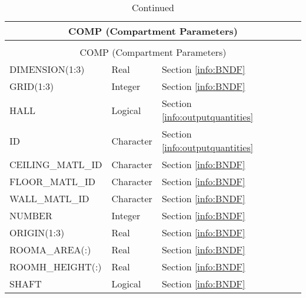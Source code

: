 \begin{longtable}{@{\extracolsep{\fill}}|l|l|l|l|l|}
\caption[Boundary file parameters ({\ct COMP} namelist group)]{For more information see Section~\ref{info:BNDF}.}
\label{tbl:COMP} \\
\hline
\multicolumn{5}{|c|}{{\ct COMP} (Compartment Parameters)} \\
\hline \hline
\endfirsthead
\caption[]{Continued} \\
\hline
\multicolumn{5}{|c|}{{\ct COMP} (Compartment Parameters)} \\
\hline \hline
\endhead
{\ct DIMENSION(1:3)}        & Real      & Section \ref{info:BNDF}                 &           &   \\ \hline
{\ct GRID(1:3)}             & Integer   & Section \ref{info:BNDF}                 &           &                 \\ \hline
{\ct HALL}                  & Logical   & Section \ref{info:outputquantities}     &           &                 \\ \hline
{\ct ID}                    & Character & Section \ref{info:outputquantities}     &           &                 \\ \hline
{\ct CEILING\_MATL\_ID}     & Character & Section \ref{info:BNDF}                 &           &                 \\ \hline
{\ct FLOOR\_MATL\_ID}       & Character & Section \ref{info:BNDF}                 &           &                 \\ \hline
{\ct WALL\_MATL\_ID}        & Character & Section \ref{info:BNDF}                 &           &                 \\ \hline
{\ct NUMBER}                & Integer   & Section \ref{info:BNDF}                 &           &                 \\ \hline
{\ct ORIGIN(1:3)}           & Real      & Section \ref{info:BNDF}                 &           &                 \\ \hline
{\ct ROOMA\_AREA(:)}        & Real      & Section \ref{info:BNDF}                 &           &                 \\ \hline
{\ct ROOMH\_HEIGHT(:)}      & Real      & Section \ref{info:BNDF}                 &           &                 \\ \hline
{\ct SHAFT}                 & Logical   & Section \ref{info:BNDF}                 &           &                 \\ \hline
\end{longtable}

